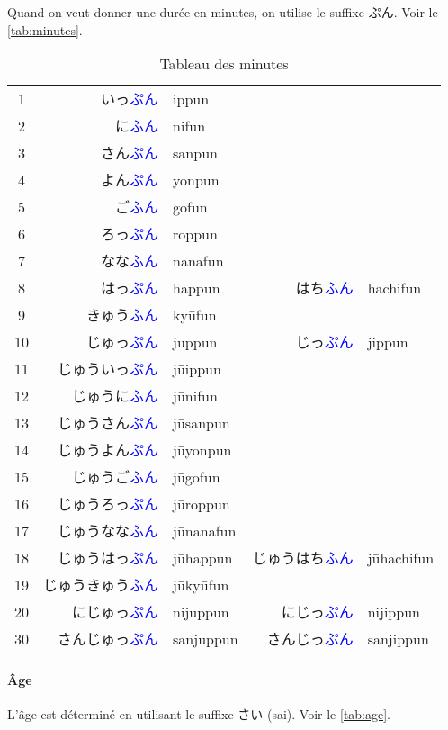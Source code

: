 \documentclass[a4paper,10pt,french,openany]{memoir}
\newcommand{\term}[1]{\textcolor{blue}{#1}}
\begin{document}
Quand on veut donner une durée en minutes, on utilise le suffixe ぷん. Voir le \autoref{tab:minutes}.

\begin{table}[htbp]
 \centering
 \caption{Tableau des minutes}
 \label{tab:minutes}
 \begin{tabular}{crlrl}
  1 & いっ\term{ぷん} &ippun\\
  2 & に\term{ふん} &nifun\\
  3 & さん\term{ぷん} &sanpun\\
  4 & よん\term{ぷん} &yonpun\\
  5 & ご\term{ふん} &gofun\\
  6 & ろっ\term{ぷん} &roppun\\
  7 & なな\term{ふん} &nanafun\\
  8 & はっ\term{ぷん} &happun & はち\term{ふん} & hachifun\\
  9 & きゅう\term{ふん} &kyūfun\\
  10& じゅっ\term{ぷん} &juppun & じっ\term{ぷん} & jippun\\
  11& じゅういっ\term{ぷん} &jūippun\\
  12& じゅうに\term{ふん} &jūnifun\\
  13& じゅうさん\term{ぷん} &jūsanpun\\
  14& じゅうよん\term{ぷん} &jūyonpun\\
  15& じゅうご\term{ふん} &jūgofun\\
  16& じゅうろっ\term{ぷん} &jūroppun\\
  17& じゅうなな\term{ふん} &jūnanafun\\
  18& じゅうはっ\term{ぷん} &jūhappun & じゅうはち\term{ふん} & jūhachifun\\
  19& じゅうきゅう\term{ふん}&jūkyūfun\\
  20& にじゅっ\term{ぷん} &nijuppun & にじっ\term{ぷん} & nijippun\\
  30& さんじゅっ\term{ぷん} &sanjuppun & さんじっ\term{ぷん} & sanjippun\\
 \end{tabular}
\end{table}

\paragraph{Âge}

L'âge est déterminé en utilisant le suffixe さい (sai). Voir le \autoref{tab:age}.
\end{document}
